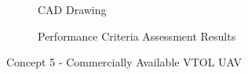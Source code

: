\begin{figure}[H]
\centering
\begin{subfigure}[t]{.5\textwidth}
  \centering
  \caption{CAD Drawing}
  \label{fig:cad1}
\end{subfigure}%
\begin{subfigure}[t]{.5\textwidth}
  \centering
  \caption{Performance Criteria Assessment Results}
  \label{fig:radar1}
\end{subfigure}
\caption{Concept 5 - Commercially Available VTOL UAV}
\label{fig:concept2}
\end{figure}


